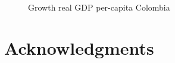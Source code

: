 \documentclass[
  ignorenonframetext,
]{beamer}
\begin{document}
\begin{frame}{}
\label{section-18}
\begin{figure}


\caption{\label{fig-growth-real-gdp-pc-col-usa}Growth real GDP
per-capita Colombia}

\end{figure}%
\end{frame}

\section{Acknowledgments}\label{acknowledgments}
\end{document}

